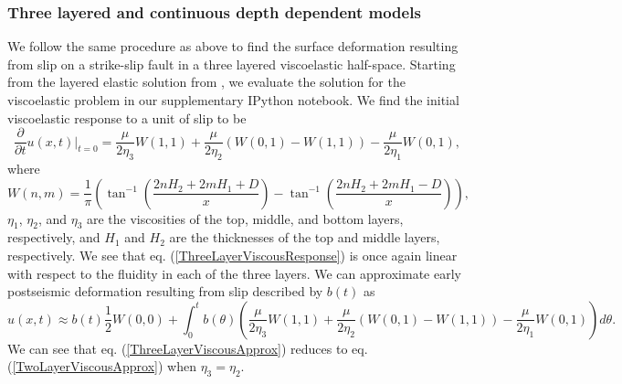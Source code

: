 \subsubsection{Three layered and continuous depth dependent models}\label{2d3LModel}
We follow the same procedure as above to find the surface
deformation resulting from slip on a strike-slip fault in a three
layered viscoelastic half-space.  Starting from the layered elastic
solution from \citet{Chinnery1972}, we evaluate the solution for the
viscoelastic problem in our supplementary IPython notebook.  We find
the initial viscoelastic response to a unit of slip to be
\begin{equation}\label{ThreeLayerViscousResponse}
\frac{\partial}{\partial t}u(x,t)\big|_{t=0} = \frac{\mu}{2\eta_3}W(1,1)
                                      +\frac{\mu}{2\eta_2}(W(0,1) - W(1,1))
                                      -\frac{\mu}{2\eta_1}W(0,1),
\end{equation}
where
\begin{equation}
  W(n,m) = \frac{1}{\pi}\left(\tan^{-1}\left(\frac{2nH_2 + 2mH_1 + D}{x}\right) - 
                              \tan^{-1}\left(\frac{2nH_2 + 2mH_1 - D}{x}\right)\right),
\end{equation}
$\eta_1$, $\eta_2$, and $\eta_3$ are the viscosities of the top,
middle, and bottom layers, respectively, and $H_1$ and $H_2$ are the
thicknesses of the top and middle layers, respectively.  We see that
eq. (\ref{ThreeLayerViscousResponse}) is once again linear with
respect to the fluidity in each of the three layers.  We can
approximate early postseismic deformation resulting from slip
described by $b(t)$ as
\begin{equation}\label{ThreeLayerViscousApprox}
u(x,t) \approx b(t)\frac{1}{2} W(0,0) + 
         \int_0^tb(\theta)\left(\frac{\mu}{2\eta_3}W(1,1)
                               +\frac{\mu}{2\eta_2}(W(0,1) - W(1,1))
                               -\frac{\mu}{2\eta_1}W(0,1)\right)d\theta.
\end{equation}
We can see that eq. (\ref{ThreeLayerViscousApprox}) reduces to eq.
(\ref{TwoLayerViscousApprox}) when $\eta_3 = \eta_2$.

